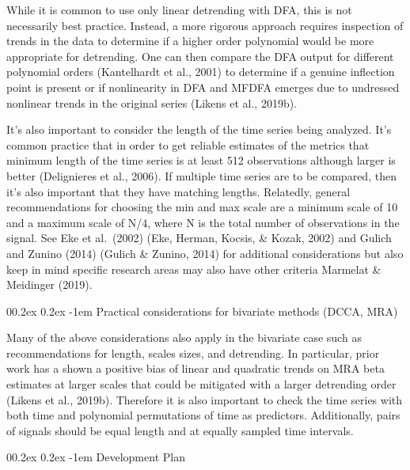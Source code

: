 \documentclass[
  man]{apa6}
\makeatletter
\let\oldparagraph\paragraph
\renewcommand{\paragraph}[1]{\oldparagraph{#1}\mbox{}}
\renewcommand{\paragraph}{\@startsection{paragraph}{4}{\parindent}%
  {0\baselineskip \@plus 0.2ex \@minus 0.2ex}%
  {-1em}%
  {\normalfont\normalsize\bfseries\itshape\typesectitle}}
\makeatother
\begin{document}
While it is common to use only linear detrending with DFA, this is not
necessarily best practice. Instead, a more rigorous approach requires
inspection of trends in the data to determine if a higher order
polynomial would be more appropriate for detrending. One can then
compare the DFA output for different polynomial orders
(Kantelhardt et al., 2001) to determine if a
genuine inflection point is present or if nonlinearity in DFA and MFDFA
emerges due to undressed nonlinear trends in the original series
(Likens et al., 2019b).

It's also important to consider the length of the time series being
analyzed. It's common practice that in order to get reliable estimates
of the metrics that minimum length of the time series is at least 512
observations although larger is better (Delignieres et al., 2006). If multiple
time series are to be compared, then it's also important that they have
matching lengths. Relatedly, general recommendations for choosing the
min and max scale are a minimum scale of 10 and a maximum scale of N/4,
where N is the total number of observations in the signal. See Eke et
al.~(2002) (Eke, Herman, Kocsis, \& Kozak, 2002) and Gulich and
Zunino (2014) (Gulich \& Zunino, 2014) for additional
considerations but also keep in mind specific research areas may also
have other criteria Marmelat \& Meidinger (2019).

\hypertarget{practical-considerations-for-bivariate-methods-dcca-mra}{%
\paragraph{Practical considerations for bivariate methods (DCCA, MRA)}\label{practical-considerations-for-bivariate-methods-dcca-mra}}

Many of the above considerations also apply in the bivariate case such
as recommendations for length, scales sizes, and detrending. In
particular, prior work has a shown a positive bias of linear and
quadratic trends on MRA beta estimates at larger scales that could be
mitigated with a larger detrending order (Likens et al., 2019b). Therefore it is
also important to check the time series with both time and polynomial
permutations of time as predictors. Additionally, pairs of signals
should be equal length and at equally sampled time intervals.

\hypertarget{development-plan}{%
\paragraph{Development Plan}\label{development-plan}}
\end{document}
